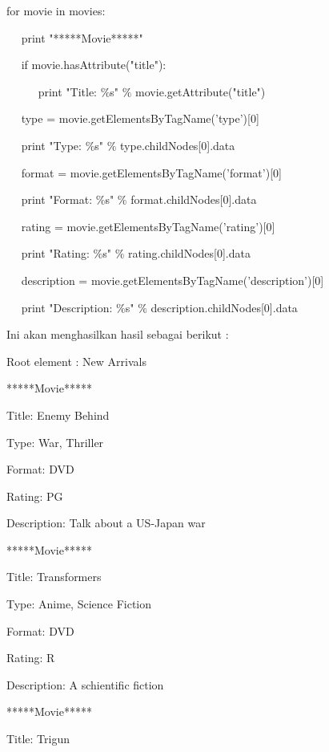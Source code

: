 \documentclass{wileySix}
\begin{document}
\begin{myEnumerate}
{\noindent 
for movie in movies: \par
\noindent 
~~ print "*****Movie*****" \par
\noindent 
~~ if movie.hasAttribute("title"): \par
\noindent 
~~~~~ print "Title:  $  \%  $s"  $  \%  $ movie.getAttribute("title") \par
\vspace{12pt}
\noindent 
~~ type = movie.getElementsByTagName('type')[0] \par
\noindent 
~~ print "Type:  $  \%  $s"  $  \%  $ type.childNodes[0].data \par
\noindent 
~~ format = movie.getElementsByTagName('format')[0] \par
\noindent 
~~ print "Format:  $  \%  $s"  $  \%  $ format.childNodes[0].data \par
\noindent 
~~ rating = movie.getElementsByTagName('rating')[0] \par
\noindent 
~~ print "Rating:  $  \%  $s"  $  \%  $ rating.childNodes[0].data \par
\noindent 
~~ description = movie.getElementsByTagName('description')[0] \par
\noindent 
~~ print "Description:  $  \%  $s"  $  \%  $ description.childNodes[0].data \par
\vspace{12pt}
\noindent 
Ini akan menghasilkan hasil sebagai berikut : \par
\noindent 
Root element : New Arrivals \par
\noindent 
*****Movie***** \par
\noindent 
Title: Enemy Behind \par
\noindent 
Type: War, Thriller \par
\noindent 
Format: DVD \par
\noindent 
Rating: PG \par
\noindent 
Description: Talk about a US-Japan war \par
\noindent 
*****Movie***** \par
\noindent 
Title: Transformers \par
\noindent 
Type: Anime, Science Fiction \par
\noindent 
Format: DVD \par
\noindent 
Rating: R \par
\noindent 
Description: A schientific fiction \par
\noindent 
*****Movie***** \par
\noindent 
Title: Trigun \par
}
\end{myEnumerate}
\end{document}
